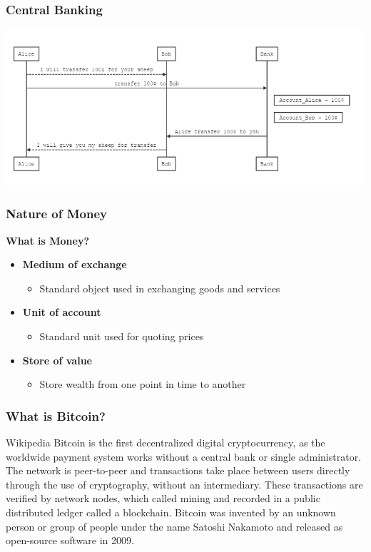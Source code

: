 \begin{frame}
    \frametitle{Central Banking}
    \includegraphics[scale=0.4]{./figures/central-banking.png}
\end{frame}

\begin{frame}
    \frametitle{Nature of Money}
    \textbf{What is Money?}
    \begin{itemize}
        \item \textbf{Medium of exchange}
            \begin{itemize}
                \item Standard object used in exchanging goods and services
            \end{itemize}
        \item \textbf{Unit of account}
            \begin{itemize}
                \item Standard unit used for quoting prices
            \end{itemize}
        \item \textbf{Store of value}
            \begin{itemize}
                \item Store wealth from one point in time to another
            \end{itemize}
    \end{itemize}
\end{frame}

\begin{frame}
    \frametitle{What is Bitcoin?}
    \begin{block}{Wikipedia}
        Bitcoin is the first \alert{decentralized digital cryptocurrency}, as the \alert{worldwide payment system} works without a central bank or single administrator. The network is \alert{peer-to-peer} and transactions take place between users directly through the use of cryptography, without an intermediary. These \alert{transactions} are verified by network nodes, which called \alert{mining} and recorded in a \alert{public distributed ledger} called a \alert{blockchain}. Bitcoin was invented by an unknown person or group of people under the name \alert{Satoshi Nakamoto} and released as \alert{open-source software} in 2009.
    \end{block}
\end{frame}

